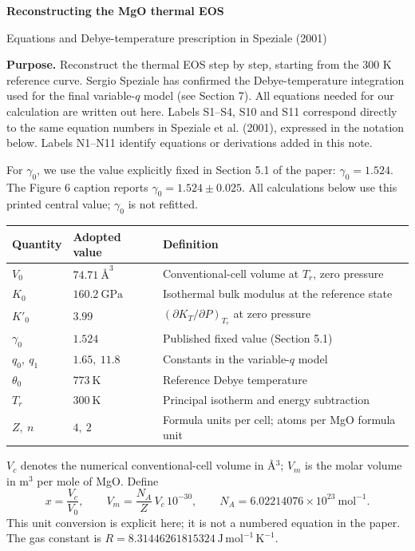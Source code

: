\documentclass[a4paper,10pt]{article}
\newcommand{\sectiontitle}[1]{\vspace{5pt}{\large\bfseries\color{ink}#1}\par}
\newcommand{\GPa}{\mathrm{GPa}}
\begin{document}
{\LARGE\bfseries\color{ink}Reconstructing the MgO thermal EOS}\par
{\large Equations and Debye-temperature prescription in Speziale (2001)}\par
\vspace{3pt}
\textbf{Purpose.} Reconstruct the thermal EOS step by step, starting from the
300 K reference curve. Sergio Speziale has confirmed the Debye-temperature
integration used for the final variable-$q$ model (see Section 7).
All equations needed for our calculation are
written out here. Labels S1--S4, S10 and S11 correspond directly to the same
equation numbers in Speziale et al. (2001), expressed in the notation below.
Labels N1--N11 identify equations or derivations added in this note.

\sectiontitle{1. Reference state and normalization}
For $\gamma_0$, we use the value explicitly fixed in Section 5.1 of the paper:
$\gamma_0=1.524$. The Figure 6 caption reports $\gamma_0=1.524\pm0.025$.
All calculations below use this printed central value; $\gamma_0$ is not refitted.
\begin{center}
\renewcommand{\arraystretch}{1.14}
\begin{tabular}{lll}
\toprule
Quantity & Adopted value & Definition \\
\midrule
$V_0$ & $74.71\ \text{\AA}^{3}$ & Conventional-cell volume at $T_r$, zero pressure \\
$K_0$ & $160.2\ \GPa$ & Isothermal bulk modulus at the reference state \\
$K'_0$ & $3.99$ & $(\partial K_T/\partial P)_{T_r}$ at zero pressure \\
$\gamma_0$ & $1.524$ & Published fixed value (Section 5.1) \\
$q_0,\ q_1$ & $1.65,\ 11.8$ & Constants in the variable-$q$ model \\
$\theta_0$ & $773\ \mathrm{K}$ & Reference Debye temperature \\
$T_r$ & $300\ \mathrm{K}$ & Principal isotherm and energy subtraction \\
$Z,\ n$ & $4,\ 2$ & Formula units per cell; atoms per MgO formula unit \\
\bottomrule
\end{tabular}
\end{center}
$V_c$ denotes the numerical conventional-cell volume in \AA$^3$;
$V_m$ is the molar volume in m$^3$ per mole of MgO. Define
\begin{equation}\label{eq:volume}
 x=\frac{V_c}{V_0},\qquad V_m=\frac{N_A}{Z}\,V_c\,10^{-30},
 \qquad N_A=6.02214076\times10^{23}\ \mathrm{mol}^{-1}.\tag{N1}
\end{equation}
This unit conversion is explicit here; it is not a numbered equation in the
paper. The gas constant is $R=8.31446261815324\ \mathrm{J\,mol^{-1}\,K^{-1}}$.
\end{document}

